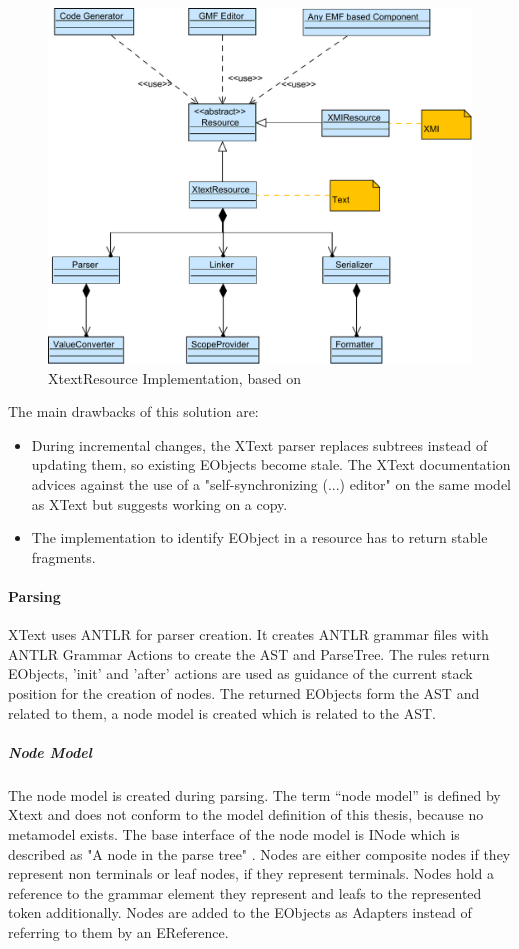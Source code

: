\begin{figure}
\centering
\includegraphics[scale=0.75]{gfx/ex/Xtext} 
\caption{XtextResource Implementation, based on \cite{XTextMan}}
\label{XtextArch}
\end{figure}
The main drawbacks of this solution are:
\begin{itemize}
	\item During incremental changes, the XText parser replaces subtrees instead of updating them, so existing EObjects become stale. The XText documentation advices against the use of a "self-synchronizing (...) editor" on the same model as XText but suggests working on a copy.
	\item The implementation to identify EObject in a resource has to return stable fragments.
\end{itemize}

\paragraph{Parsing}
XText uses ANTLR \cite{ANTLR} for parser creation. It creates ANTLR grammar files with ANTLR Grammar Actions to create the AST and ParseTree. The rules return EObjects, 'init' and 'after' actions are used as guidance of the current stack position for the creation of nodes. The returned EObjects form the AST and related to them, a node model is created which is related to the AST. 

\subparagraph{Node Model}
The node model is created during parsing. The term ``node model'' is defined by Xtext and does not conform to the model definition of this thesis, because no metamodel exists. The base interface of the node model is INode which  is described as "A node in the parse tree" \cite{XTextAPI}. Nodes are either composite nodes if they represent non terminals or leaf nodes, if they represent terminals. Nodes hold a reference to the grammar element they represent and leafs to the represented token additionally. Nodes are added to the EObjects as Adapters instead of referring to them by an EReference.

